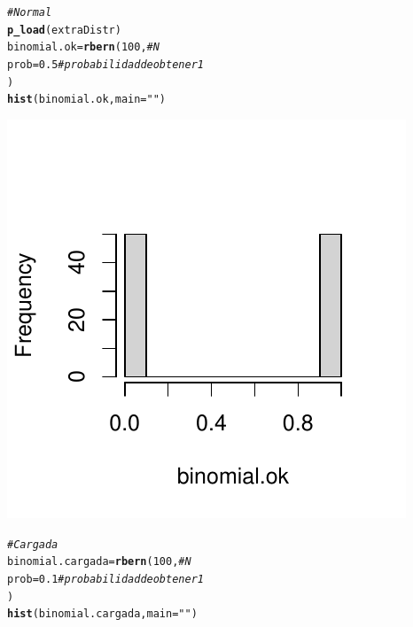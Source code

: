 \documentclass[onesided]{article}\usepackage[]{graphicx}\usepackage[]{color}
\makeatletter
\def\maxwidth{ %
  \ifdim\Gin@nat@width>\linewidth
    \linewidth
  \else
    \Gin@nat@width
  \fi
}
\newcommand{\hlnum}[1]{\textcolor[rgb]{0.686,0.059,0.569}{#1}}%
\newcommand{\hlstr}[1]{\textcolor[rgb]{0.192,0.494,0.8}{#1}}%
\newcommand{\hlcom}[1]{\textcolor[rgb]{0.678,0.584,0.686}{\textit{#1}}}%
\newcommand{\hlstd}[1]{\textcolor[rgb]{0.345,0.345,0.345}{#1}}%
\newcommand{\hlkwb}[1]{\textcolor[rgb]{0.69,0.353,0.396}{#1}}%
\newcommand{\hlkwc}[1]{\textcolor[rgb]{0.333,0.667,0.333}{#1}}%
\newcommand{\hlkwd}[1]{\textcolor[rgb]{0.737,0.353,0.396}{\textbf{#1}}}%
\newenvironment{kframe}{%
 \def\at@end@of@kframe{}%
 \ifinner\ifhmode%
  \def\at@end@of@kframe{\end{minipage}}%
  \begin{minipage}{\columnwidth}%
 \fi\fi%
 \def\FrameCommand##1{\hskip\@totalleftmargin \hskip-\fboxsep
 \colorbox{shadecolor}{##1}\hskip-\fboxsep
     \hskip-\linewidth \hskip-\@totalleftmargin \hskip\columnwidth}%
 \MakeFramed {\advance\hsize-\width
   \@totalleftmargin\z@ \linewidth\hsize
   \@setminipage}}%
 {\par\unskip\endMakeFramed%
 \at@end@of@kframe}
\newenvironment{knitrout}{}{} %
\makeatother
\begin{document}
\begin{knitrout}
\color{fgcolor}\begin{kframe}
\begin{alltt}
\hlcom{# Normal }
\hlkwd{p_load}\hlstd{(extraDistr)}
\hlstd{binomial.ok} \hlkwb{=}  \hlkwd{rbern}\hlstd{(}\hlnum{100}\hlstd{,} \hlcom{# N}
                     \hlkwc{prob} \hlstd{=} \hlnum{0.5} \hlcom{# probabilidad de obtener 1}
                     \hlstd{)}
\hlkwd{hist}\hlstd{(binomial.ok,} \hlkwc{main} \hlstd{=} \hlstr{""}\hlstd{)}
\end{alltt}
\end{kframe}

{\centering \includegraphics[width=\maxwidth]{figure/bernoulli-1} 

}


\begin{kframe}\begin{alltt}
\hlcom{# Cargada }
\hlstd{binomial.cargada} \hlkwb{=}  \hlkwd{rbern}\hlstd{(}\hlnum{100}\hlstd{,} \hlcom{# N}
                     \hlkwc{prob} \hlstd{=} \hlnum{0.1} \hlcom{# probabilidad de obtener 1}
                     \hlstd{)}
\hlkwd{hist}\hlstd{(binomial.cargada,} \hlkwc{main} \hlstd{=} \hlstr{""}\hlstd{)}
\end{alltt}
\end{kframe}


\end{knitrout}
\end{document}
